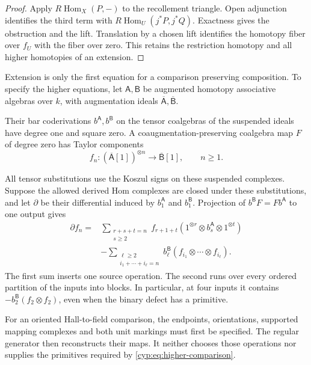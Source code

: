 \begin{proof}
Apply \(R\operatorname{Hom}_X(P,-)\) to the recollement
triangle. Open adjunction identifies the third term with
\(R\operatorname{Hom}_U(j^*P,j^*Q)\). Exactness gives the
obstruction and the lift. Translation by a chosen lift
identifies the homotopy fiber over \(f_U\) with the fiber
over zero. This retains the restriction homotopy and all
higher homotopies of an extension.
\end{proof}

Extension is only the first equation for a comparison
preserving composition. To specify the higher equations,
let \(\mathsf A,\mathsf B\) be augmented homotopy
associative algebras over \(k\), with augmentation ideals
\(\overline{\mathsf A},\overline{\mathsf B}\).

Their bar coderivations \(b^{\mathsf A},b^{\mathsf B}\)
on the tensor coalgebras of the suspended ideals have
degree one and square zero. A coaugmentation-preserving
coalgebra map \(F\) of degree zero has Taylor components
\[
 f_n:(\overline{\mathsf A}[1])^{\otimes n}
                         \longrightarrow\overline{\mathsf B}[1],
                         \qquad n\geq1.
\]

All tensor substitutions use the Koszul signs on these
suspended complexes. Suppose the allowed derived Hom
complexes are closed under these substitutions, and let
\(\partial\) be their differential induced by
\(b_1^{\mathsf A}\) and \(b_1^{\mathsf B}\).
Projection of \(b^{\mathsf B}F=Fb^{\mathsf A}\) to one
output gives
\begin{equation}\label{cyp:eq:higher-comparison}
\begin{split}
 \partial f_n={}&
 \sum_{\substack{r+s+t=n\\s\geq2}}
 f_{r+1+t}(1^{\otimes r}\otimes b_s^{\mathsf A}
                                      \otimes1^{\otimes t})\\
 &-\sum_{\substack{\ell\geq2\\i_1+\cdots+i_\ell=n}}
 b_\ell^{\mathsf B}(f_{i_1}\otimes\cdots\otimes f_{i_\ell}).
\end{split}
\end{equation}
The first sum inserts one source operation. The second
runs over every ordered partition of the inputs into
blocks. In particular, at four inputs it contains
\(-b_2^{\mathsf B}(f_2\otimes f_2)\), even when the binary
defect has a primitive.

For an oriented Hall-to-field comparison, the endpoints,
orientations, supported mapping complexes and both unit
markings must first be specified. The regular generator
then reconstructs their maps. It neither chooses those
operations nor supplies the primitives required by
\eqref{cyp:eq:higher-comparison}.
